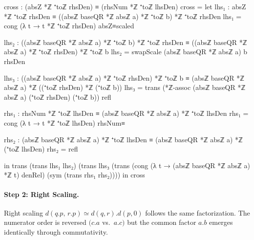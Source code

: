 \documentclass[11pt,a4paper]{book}
\def\cdot{.}%
\begin{document}
\begin{code}
    cross : (absZ *ℤ ⁺toℤ rhsDen) ≡ (rhsNum *ℤ ⁺toℤ lhsDen)
    cross =
      let
        lhs₁ : absZ *ℤ ⁺toℤ rhsDen ≡ ((absℤ baseQR *ℤ absℤ a) *ℤ ⁺toℤ b) *ℤ ⁺toℤ rhsDen
        lhs₁ = cong (λ t → t *ℤ ⁺toℤ rhsDen) absZ≡scaled

        lhs₂ : ((absℤ baseQR *ℤ absℤ a) *ℤ ⁺toℤ b) *ℤ ⁺toℤ rhsDen ≡ ((absℤ baseQR *ℤ absℤ a) *ℤ ⁺toℤ rhsDen) *ℤ ⁺toℤ b
        lhs₂ = swapScale (absℤ baseQR *ℤ absℤ a) b rhsDen

        lhs₃ : ((absℤ baseQR *ℤ absℤ a) *ℤ ⁺toℤ rhsDen) *ℤ ⁺toℤ b ≡ (absℤ baseQR *ℤ absℤ a) *ℤ ((⁺toℤ rhsDen) *ℤ (⁺toℤ b))
        lhs₃ =
          trans
            (*ℤ-assoc (absℤ baseQR *ℤ absℤ a) (⁺toℤ rhsDen) (⁺toℤ b))
            refl

        rhs₁ : rhsNum *ℤ ⁺toℤ lhsDen ≡ (absℤ baseQR *ℤ absℤ a) *ℤ ⁺toℤ lhsDen
        rhs₁ = cong (λ t → t *ℤ ⁺toℤ lhsDen) rhsNum≡

        rhs₂ : (absℤ baseQR *ℤ absℤ a) *ℤ ⁺toℤ lhsDen ≡ (absℤ baseQR *ℤ absℤ a) *ℤ (⁺toℤ lhsDen)
        rhs₂ = refl

      in
      trans
        (trans lhs₁ lhs₂)
        (trans
          lhs₃
          (trans
            (cong (λ t → (absℤ baseQR *ℤ absℤ a) *ℤ t) denRel)
            (sym (trans rhs₁ rhs₂))))
  in
  cross
\end{code}

\paragraph{Step 2: Right Scaling.}
Right scaling $d(q \cdot p,\, r \cdot p) \simeq d(q,r) \cdot d(p,0)$
follows the same factorization. The numerator order is reversed
$(c \cdot a$ vs.~$a \cdot c)$ but the common factor $a \cdot b$
emerges identically through commutativity.
\end{document}
